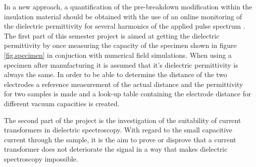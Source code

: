 In a new approach, a quantification of the pre-breakdown modification within the insulation material should be obtained with the use of an online monitoring of the dielectric permittivity for several harmonics of the applied pulse spectrum \cite{FaerberMVISS}.
The first part of this semester project is aimed at getting the dielectric permittivity by once measuring the capacity of the specimen shown in figure \ref{fig.specimen} in conjuction with numerical field simulations. When using a specimen after manufacturing it is assumed that it's dielectric permittivity is always the same. In order to be able to determine the distance of the two electrodes a reference measurement of the actual distance and the permittivity for two samples is made and a look-up table containing the electrode distance for different vacuum capacities is created. 

The second part of the project is the investigation of the suitability of current transformers in dielectric spectroscopy. With regard to the small capacitive current through the sample, it is the aim to prove or disprove that a current transformer does not deteriorate the signal in a way that makes dielectric spectroscopy impossible. 


